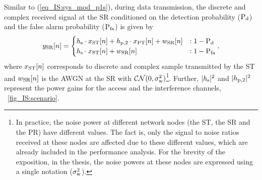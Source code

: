 Similar to (\ref{eq_IS:sys_mod_p1s}), during data transmission, the discrete and complex received signal at the SR conditioned on the detection probability ($\text{P}_{\text{d}}$) and the false alarm probability ($\text{P}_{\text{fa}}$) is given by
\begin{equation}
y_{\text{SR}}[n] = 
\begin{cases}
h_{\text{s}} \cdot x_{\text{ST}}[n] + h_{\text{p,2}} \cdot x_{\text{PT}}[n] +  w_{\text{SR}}[n] & : 1 - \text{P}_{\text{d}} \\
h_{\text{s}} \cdot x_{\text{ST}}[n] + w_{\text{SR}}[n] & : 1 - \text{P}_{\text{fa}}
\end{cases},
\label{eq_IS:sys_mod_ss}
\end{equation}
where $x_{\text{ST}}[n]$ corresponds to discrete and complex sample transmitted by the ST and $w_{\text{SR}}[n]$ is the AWGN at the SR with $\mathcal{CN}(0, \sigma^2_{\text{w}})$\footnote{In practice, the noise power at different network nodes (the ST, the SR and the PR) have different values. The fact is, only the signal to noise ratios  received at these nodes are affected due to these different values, which are already included in the performance analysis. For the brevity of the exposition, in the thesis, the noise powers at these nodes are expressed using a single notation ($\sigma^2_{\text{w}}$).}. Further, $|h_{\text{s}}|^2$ and $|h_{\text{p,2}}|^2$ represent the power gains for the access and the interference channels,  \figurename~\ref{fig_IS:scenario}. 


